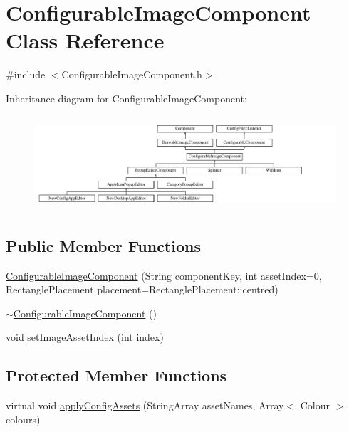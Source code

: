 \hypertarget{classConfigurableImageComponent}{}\section{Configurable\+Image\+Component Class Reference}
\label{classConfigurableImageComponent}


{\ttfamily \#include $<$Configurable\+Image\+Component.\+h$>$}

Inheritance diagram for Configurable\+Image\+Component\+:\begin{figure}[H]
\begin{center}
\leavevmode
\includegraphics[height=3.555556cm]{classConfigurableImageComponent}
\end{center}
\end{figure}
\subsection*{Public Member Functions}
\begin{DoxyCompactItemize}
\item 
\mbox{\hyperlink{classConfigurableImageComponent_ac042432f64c634be50461def53a60adc}{Configurable\+Image\+Component}} (String component\+Key, int asset\+Index=0, Rectangle\+Placement placement=Rectangle\+Placement\+::centred)
\item 
\mbox{\hyperlink{classConfigurableImageComponent_a79538b0b26297d47066fdc277e1adc87}{$\sim$\+Configurable\+Image\+Component}} ()
\item 
void \mbox{\hyperlink{classConfigurableImageComponent_a6ba9337ff07830dec610540c12277234}{set\+Image\+Asset\+Index}} (int index)
\end{DoxyCompactItemize}
\subsection*{Protected Member Functions}
\begin{DoxyCompactItemize}
\item 
virtual void \mbox{\hyperlink{classConfigurableImageComponent_ad7670a14df8fd20780f91d85db2ec542}{apply\+Config\+Assets}} (String\+Array asset\+Names, Array$<$ Colour $>$ colours)
\end{DoxyCompactItemize}
